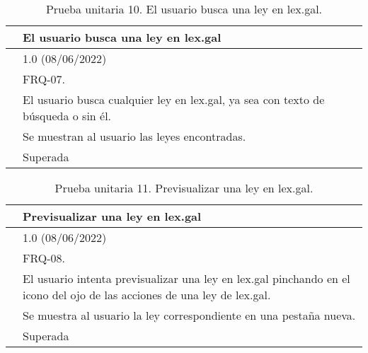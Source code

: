 \begin{table}[H]
\begin{center}
\begin{tabular}{|p{3cm}|p{10cm}|} \hline
\centering {\bf PU-10} & El usuario busca una ley en lex.gal  \\ \hline\hline
\centering {\bf Versión} & 1.0 (08/06/2022) \\ \hline
\centering {\bf Dependencias} & FRQ-07. \\ \hline
\centering {\bf Descripción} &  El usuario busca cualquier ley en lex.gal, ya sea con texto de búsqueda o sin él. \\ \hline
\centering {\bf Criterio de aceptación} & Se muestran al usuario las leyes encontradas. \\ \hline
\centering {\bf Estado} & Superada \\ \hline
\end{tabular}
\caption{Prueba unitaria 10. El usuario busca una ley en lex.gal.}
\label{enlacePU10}
\end{center}
\end{table}

\begin{table}[H]
\begin{center}
\begin{tabular}{|p{3cm}|p{10cm}|} \hline
\centering {\bf PU-11} & Previsualizar una ley en lex.gal  \\ \hline\hline
\centering {\bf Versión} & 1.0 (08/06/2022) \\ \hline
\centering {\bf Dependencias} & FRQ-08. \\ \hline
\centering {\bf Descripción} &  El usuario intenta previsualizar una ley en lex.gal pinchando en el icono del ojo de las acciones de una ley de lex.gal. \\ \hline
\centering {\bf Criterio de aceptación} & Se muestra al usuario la ley correspondiente en una pestaña nueva. \\ \hline
\centering {\bf Estado} & Superada \\ \hline
\end{tabular}
\caption{Prueba unitaria 11. Previsualizar una ley en lex.gal.}
\label{enlacePU11}
\end{center}
\end{table}

